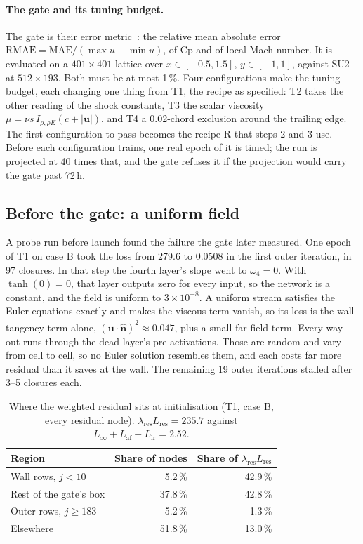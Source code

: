 \documentclass[11pt]{article}
\newcommand{\vu}{\bm{u}}
\begin{document}
\paragraph{The gate and its tuning budget.}
The gate is their error metric~\cite[Eq.~28]{wassing2025}: the relative mean absolute error
$\mathrm{RMAE} = \mathrm{MAE}/(\max u - \min u)$, of Cp and of local Mach number. It is evaluated
on a $401\times401$ lattice over $x\in[-0.5,1.5]$, $y\in[-1,1]$, against SU2 at $512\times193$.
Both must be at most 1\,\%. Four configurations make the tuning budget, each changing one thing
from T1, the recipe as specified: T2 takes the other reading of the shock constants, T3 the scalar
viscosity $\mu = \nu s\,I_{\rho,\rho E}(c+|\vu|)$, and T4 a 0.02-chord exclusion around the
trailing edge. The first configuration to pass becomes the recipe R that steps 2 and 3 use. Before
each configuration trains, one real epoch of it is timed; the run is projected at 40 times that,
and the gate refuses it if the projection would carry the gate past 72\,h.

\subsection{Before the gate: a uniform field}
\label{sec:s5trap}

A probe run before launch found the failure the gate later measured. One epoch of T1 on case B
took the loss from 279.6 to 0.0508 in the first outer iteration, in 97 closures. In that step the
fourth layer's slope went to $\omega_4 = 0$. With $\tanh(0) = 0$, that layer outputs zero for
every input, so the network is a constant, and the field is uniform to $3\times10^{-8}$. A uniform
stream satisfies the Euler equations exactly and makes the viscous term vanish, so its loss is the
wall-tangency term alone, $\overline{(\vu\cdot\hat{\bm n})^2}\approx 0.047$, plus a small far-field
term. Every way out runs through the dead layer's pre-activations. Those are random and vary from
cell to cell, so no Euler solution resembles them, and each costs far more residual than it saves
at the wall. The remaining 19 outer iterations stalled after 3--5 closures each.

\begin{table}[t]
\centering\small
\caption{Where the weighted residual sits at initialisation (T1, case B, every residual node).
$\lambda_{\mathrm{res}}L_{\mathrm{res}} = 235.7$ against $L_\infty+L_{\mathrm{af}}+L_{\mathrm{lr}}
= 2.52$.}
\label{tab:s5split}
\begin{tabular}{@{}lrr@{}}
\toprule
Region & Share of nodes & Share of $\lambda_{\mathrm{res}}L_{\mathrm{res}}$\\
\midrule
Wall rows, $j<10$ & 5.2\,\% & 42.9\,\%\\
Rest of the gate's box & 37.8\,\% & 42.8\,\%\\
Outer rows, $j\ge183$ & 5.2\,\% & 1.3\,\%\\
Elsewhere & 51.8\,\% & 13.0\,\%\\
\bottomrule
\end{tabular}
\end{table}
\end{document}
